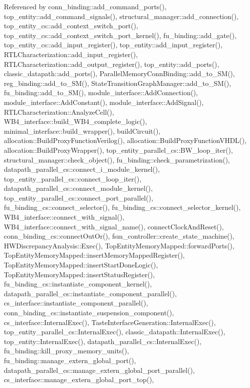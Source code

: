 Referenced by conn\+\_\+binding\+::add\+\_\+command\+\_\+ports(), top\+\_\+entity\+::add\+\_\+command\+\_\+signals(), structural\+\_\+manager\+::add\+\_\+connection(), top\+\_\+entity\+\_\+cs\+::add\+\_\+context\+\_\+switch\+\_\+port(), top\+\_\+entity\+\_\+cs\+::add\+\_\+context\+\_\+switch\+\_\+port\+\_\+kernel(), fu\+\_\+binding\+::add\+\_\+gate(), top\+\_\+entity\+\_\+cs\+::add\+\_\+input\+\_\+register(), top\+\_\+entity\+::add\+\_\+input\+\_\+register(), R\+T\+L\+Characterization\+::add\+\_\+input\+\_\+register(), R\+T\+L\+Characterization\+::add\+\_\+output\+\_\+register(), top\+\_\+entity\+::add\+\_\+ports(), classic\+\_\+datapath\+::add\+\_\+ports(), Parallel\+Memory\+Conn\+Binding\+::add\+\_\+to\+\_\+\+S\+M(), reg\+\_\+binding\+::add\+\_\+to\+\_\+\+S\+M(), State\+Transition\+Graph\+Manager\+::add\+\_\+to\+\_\+\+S\+M(), fu\+\_\+binding\+::add\+\_\+to\+\_\+\+S\+M(), module\+\_\+interface\+::\+Add\+Connection(), module\+\_\+interface\+::\+Add\+Constant(), module\+\_\+interface\+::\+Add\+Signal(), R\+T\+L\+Characterization\+::\+Analyze\+Cell(), W\+B4\+\_\+interface\+::build\+\_\+\+W\+B4\+\_\+complete\+\_\+logic(), minimal\+\_\+interface\+::build\+\_\+wrapper(), build\+Circuit(), allocation\+::\+Build\+Proxy\+Function\+Verilog(), allocation\+::\+Build\+Proxy\+Function\+V\+H\+D\+L(), allocation\+::\+Build\+Proxy\+Wrapper(), top\+\_\+entity\+\_\+parallel\+\_\+cs\+::\+B\+W\+\_\+loop\+\_\+iter(), structural\+\_\+manager\+::check\+\_\+object(), fu\+\_\+binding\+::check\+\_\+parametrization(), datapath\+\_\+parallel\+\_\+cs\+::connect\+\_\+i\+\_\+module\+\_\+kernel(), top\+\_\+entity\+\_\+parallel\+\_\+cs\+::connect\+\_\+loop\+\_\+iter(), datapath\+\_\+parallel\+\_\+cs\+::connect\+\_\+module\+\_\+kernel(), top\+\_\+entity\+\_\+parallel\+\_\+cs\+::connect\+\_\+port\+\_\+parallel(), fu\+\_\+binding\+\_\+cs\+::connect\+\_\+selector(), fu\+\_\+binding\+\_\+cs\+::connect\+\_\+selector\+\_\+kernel(), W\+B4\+\_\+interface\+::connect\+\_\+with\+\_\+signal(), W\+B4\+\_\+interface\+::connect\+\_\+with\+\_\+signal\+\_\+name(), connect\+Clock\+And\+Reset(), conn\+\_\+binding\+\_\+cs\+::connect\+Out\+Or(), fsm\+\_\+controller\+::create\+\_\+state\+\_\+machine(), H\+W\+Discrepancy\+Analysis\+::\+Exec(), Top\+Entity\+Memory\+Mapped\+::forward\+Ports(), Top\+Entity\+Memory\+Mapped\+::insert\+Memory\+Mapped\+Register(), Top\+Entity\+Memory\+Mapped\+::insert\+Start\+Done\+Logic(), Top\+Entity\+Memory\+Mapped\+::insert\+Status\+Register(), fu\+\_\+binding\+\_\+cs\+::instantiate\+\_\+component\+\_\+kernel(), datapath\+\_\+parallel\+\_\+cs\+::instantiate\+\_\+component\+\_\+parallel(), cs\+\_\+interface\+::instantiate\+\_\+component\+\_\+parallel(), conn\+\_\+binding\+\_\+cs\+::instantiate\+\_\+suspension\+\_\+component(), cs\+\_\+interface\+::\+Internal\+Exec(), Taste\+Interface\+Generation\+::\+Internal\+Exec(), top\+\_\+entity\+\_\+parallel\+\_\+cs\+::\+Internal\+Exec(), classic\+\_\+datapath\+::\+Internal\+Exec(), top\+\_\+entity\+::\+Internal\+Exec(), datapath\+\_\+parallel\+\_\+cs\+::\+Internal\+Exec(), fu\+\_\+binding\+::kill\+\_\+proxy\+\_\+memory\+\_\+units(), fu\+\_\+binding\+::manage\+\_\+extern\+\_\+global\+\_\+port(), datapath\+\_\+parallel\+\_\+cs\+::manage\+\_\+extern\+\_\+global\+\_\+port\+\_\+parallel(), cs\+\_\+interface\+::manage\+\_\+extern\+\_\+global\+\_\+port\+\_\+top(), 
